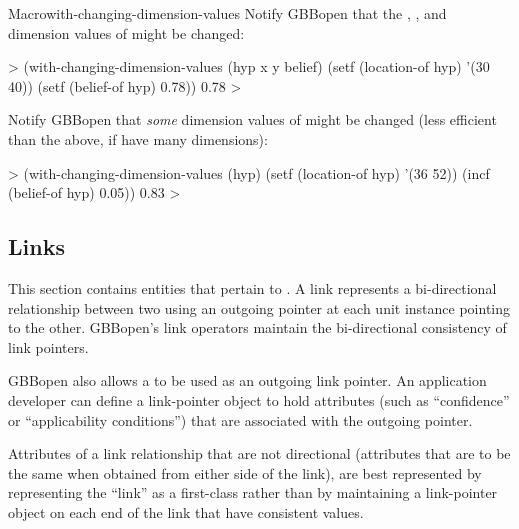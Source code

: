 \documentclass[10pt,twoside,english,pdftex]{article}
\begin{document}
\begin{functiondoc}{Macro}{with-changing-dimension-values}
\fnexamples Notify GBBopen that the , , and
 dimension values of  might be changed:
%
\W\supp
\begin{example}
  > (with-changing-dimension-values (hyp x y belief)
      (setf (location-of hyp) '(30 40))
      (setf (belief-of hyp) 0.78))
  0.78
  >
\end{example}
%
Notify GBBopen that \textit{some\/} dimension values of  might be
changed (less efficient than the above, if  
have many dimensions):
%
\W\supp\notpretop
\begin{example}
  > (with-changing-dimension-values (hyp)
      (setf (location-of hyp) '(36 52))
      (incf (belief-of hyp) 0.05))
  0.83
  >
\end{example}

\end{functiondoc}


\W\renewcommand{\subsubentities}{1}

\T\markright{}%
\T\pagestyle{plain}
\T\clearpage
\W{}
\T\pagestyle{fancy}
\T\thispagestyle{fancybottom}
\T\global\def\fnlastname{ }%

\subsection{Links}
\label{sec:links}%

This section contains  entities that pertain to
.  A link represents a bi-directional relationship between two
 using an outgoing pointer at each unit instance
pointing to the other.  GBBopen's link operators maintain the bi-directional
consistency of link pointers.

GBBopen also allows a  to be used as an outgoing
link pointer. An application developer can define a link-pointer object to
hold attributes (such as ``confidence'' or ``applicability conditions'') that
are associated with the outgoing pointer.

Attributes of a link relationship that are not directional (attributes that
are to be the same when obtained from either side of the link), are best
represented by representing the ``link'' as a first-class
 rather than by maintaining a link-pointer object on each
end of the link that have consistent values.
\end{document}
